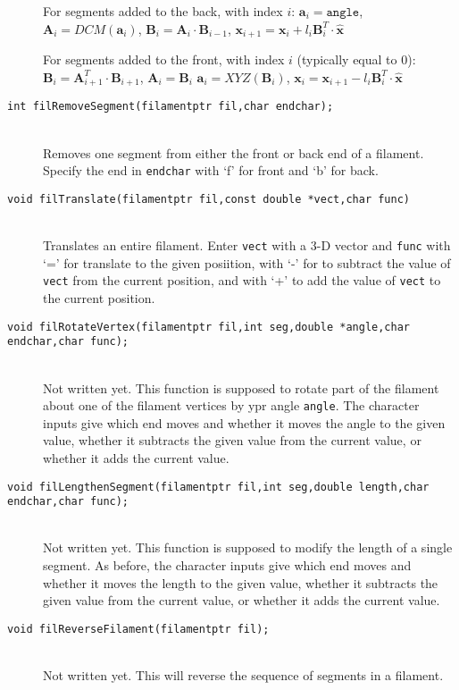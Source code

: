 \documentclass {book}
\begin{document}
\begin{description}
For segments added to the back, with index $i$:
$\mathbf{a}_i = \texttt{angle}$,
$\mathbf{A}_i = DCM(\mathbf{a}_i)$,
$\mathbf{B}_i = \mathbf{A}_i \cdot \mathbf{B}_{i-1}$,
$\mathbf{x}_{i+1} = \mathbf{x}_i + l_i \mathbf{B}^T_i \cdot \mathbf{\hat{x}}$

For segments added to the front, with index $i$ (typically equal to 0):
$\mathbf{B}_i = \mathbf{A}_{i+1}^T \cdot \mathbf{B}_{i+1}$,
$\mathbf{A}_i = \mathbf{B}_i$
$\mathbf{a}_i = XYZ(\mathbf{B}_i)$,
$\mathbf{x}_i = \mathbf{x}_{i+1} - l_i \mathbf{B}^T_i \cdot \mathbf{\hat{x}}$

\item[\texttt{int filRemoveSegment(filamentptr fil,char endchar);}]
\hfill \\
Removes one segment from either the front or back end of a filament. Specify the end in \texttt{endchar} with `f' for front and `b' for back.

\item[\texttt{void filTranslate(filamentptr fil,const double *vect,char func)}]
\hfill \\
Translates an entire filament. Enter \texttt{vect} with a 3-D vector and \texttt{func} with `=' for translate to the given posiition, with `-' for to subtract the value of \texttt{vect} from the current position, and with `+' to add the value of \texttt{vect} to the current position.

\item[\texttt{void filRotateVertex(filamentptr fil,int seg,double *angle,char endchar,char func);}]
\hfill \\
Not written yet. This function is supposed to rotate part of the filament about one of the filament vertices by ypr angle \texttt{angle}. The character inputs give which end moves and whether it moves the angle to the given value, whether it subtracts the given value from the current value, or whether it adds the current value.

\item[\texttt{void filLengthenSegment(filamentptr fil,int seg,double length,char endchar,char func);}]
\hfill \\
Not written yet. This function is supposed to modify the length of a single segment. As before, the character inputs give which end moves and whether it moves the length to the given value, whether it subtracts the given value from the current value, or whether it adds the current value.

\item[\texttt{void filReverseFilament(filamentptr fil);}]
\hfill \\
Not written yet. This will reverse the sequence of segments in a filament.


\end{description}
\end{document}
